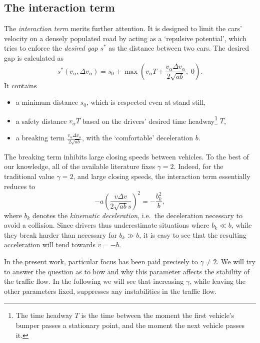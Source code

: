 \subsection{The interaction term}
\label{sec:interaction}
The \emph{interaction term} merits further attention. It is designed to limit the cars' velocity on a densely populated road by acting as a `repulsive potential', which tries to enforce the \emph{desired gap} $s^*$ as the distance between two cars. The desired gap is calculated as
\begin{equation}
s^*(v_\alpha, \Delta v_\alpha) = s_0 + \max\left(v_\alpha T + \frac{v_\alpha \Delta v_\alpha}{2\sqrt{ab}},\;0\right).
\label{eq:desired_gap}
\end{equation}
It contains
\begin{itemize}
    \item a minimum distance $s_0$, which is respected even at stand still,
    \item a safety distance $v_\alpha T$ based on the drivers' desired time headway\footnote{The time headway $T$ is the time between the moment the first vehicle's bumper passes a stationary point, and the moment the next vehicle passes it.} $T$,
    \item a breaking term $\frac{v_\alpha \Delta v_\alpha}{2\sqrt{ab}}$, with the `comfortable' deceleration $b$.
\end{itemize}
The breaking term inhibits large closing speeds between vehicles. To the best of our knowledge, all of the available literature fixes $\gamma=2$. Indeed, for the traditional value $\gamma=2$, and large closing speeds, the interaction term essentially reduces to 
\begin{equation}
    -a \left(\frac{v \Delta v}{2 \sqrt{a b}s}\right)^2 = -\frac{b_k^2}{b},
    \label{eq:decel}
\end{equation}
where $b_k$ denotes the \emph{kinematic deceleration}, i.e.\ the deceleration necessary to avoid a collision. Since drivers thus underestimate situations where $b_k\ll b$, while they break harder than necessary for $b_k\gg b$, it is easy to see that the resulting acceleration will tend towards $\dot v = -b$. \cite{treiber2000}

In the present work, particular focus has been paid precisely to  $\gamma \neq 2$. We will try to answer the question as to how and why this parameter affects the stability of the traffic flow. In the following we will see that increasing $\gamma$, while leaving the other parameters fixed, suppresses any instabilities in the traffic flow.

